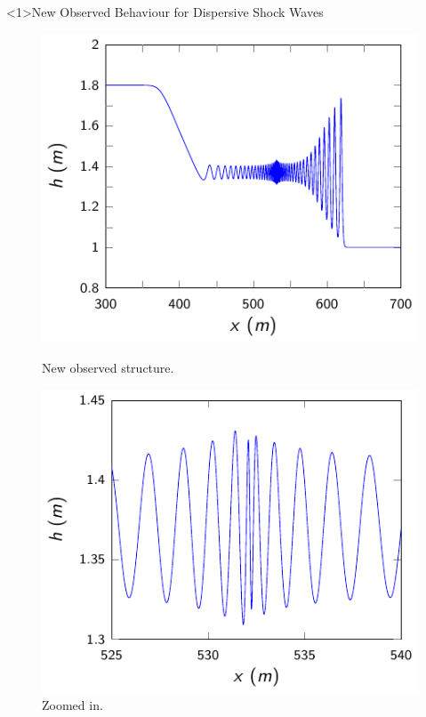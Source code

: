 \documentclass[pdf]{beamer}
\begin{document}
\begin{frame}<1>{New Observed Behaviour for Dispersive Shock Waves}
	
	\begin{figure}
		\centering
		\begin{minipage}{.5\textwidth}
			\centering
			\includegraphics[width=1\linewidth]{./Pictures/DSW/DSWN1.pdf}
			\caption{New observed structure.}
		\end{minipage}%
		\pause
		\begin{minipage}{.5\textwidth}
			\centering
			\includegraphics[width=1\linewidth]{./Pictures/DSW/DSWNz.pdf}
			\caption{Zoomed in.}
		\end{minipage}
	\end{figure}
\end{frame}
\end{document}
